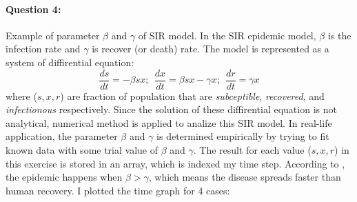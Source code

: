 \documentclass[a4paper,12pt]{article}
\begin{document}
\paragraph{Question 4:} Example of parameter $\beta$ and $\gamma$ of SIR model.
\noindent
In the SIR epidemic model, $\beta$ is the infection rate and $\gamma$ is recover (or death) rate. The model is represented as a system of diffirential equation:
$$ \frac{ds}{dt} = -\beta s x; \ \ \frac{dx}{dt} = \beta s x - \gamma x; \ \ \frac{dr}{dt} = \gamma x $$
where ($s, x, r$) are fraction of population that are \emph{subceptible}, \emph{recovered}, and \emph{infectionous} respectively. Since the solution of these diffirential equation is not analytical, numerical method is applied to analize this SIR model. In real-life application, the parameter $\beta$ and $\gamma$ is determined empirically by trying to fit known data with some trial value of $\beta$ and $\gamma$. The result for each value ($s, x, r$) in this exercise is stored in an array, which is indexed my time step. According to \cite{net}, the epidemic happens when $\beta > \gamma$, which means the disease spreads faster than human recovery. I plotted the time graph for 4 cases:
\end{document}
